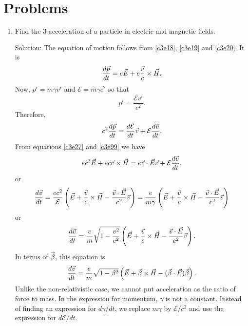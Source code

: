 \section{Problems}
\begin{enumerate}
\item Find the 3-acceleration of a particle in electric and magnetic fields.
\item[Solution:] The equation of motion follows from \eqref{c3e18}, \eqref{c3e19}
and \eqref{c3e20}. It is
\begin{equation}\label{c3e100}
\frac{d{\vec{p}}}{d{t}} = e\vec{E} + e\frac{\vec{v}}{c}\times\vec{H}.
\end{equation}
Now, $p^i = m\gamma v^i$ and $\mathcal{E} = m\gamma c^2$ so that 
\[
p^i = \frac{\mathcal{E} v^i}{c^2}.
\]
Therefore,
\[
c^2\frac{d{\vec{p}}}{d{t}} = \frac{d{\mathcal{E}}}{d{t}}\vec{v} + \mathcal{E}\frac{d{\vec{v}}}{d{t}}.
\]
From equations \eqref{c3e27} and \eqref{c3e99} we have
\[
ec^2\vec{E} + ec\vec{v}\times\vec{H} = e\vec{v}\cdot\vec{E}\vec{v} + \mathcal{E}\frac{d{\vec{v}}}{d{t}}.
\]
or
\[
\frac{d{\vec{v}}}{d{t}} = \frac{ec^2}{\mathcal{E}}
\left(\vec{E} + \frac{\vec{v}}{c}\times\vec{H} - \frac{\vec{v}\cdot\vec{E}}{c^2}\vec{v}\right)
= \frac{e}{m\gamma}
\left(\vec{E} + \frac{\vec{v}}{c}\times\vec{H} - \frac{\vec{v}\cdot\vec{E}}{c^2}\vec{v}\right)
\]
or
\begin{equation}\label{c3e101}
\frac{d{\vec{v}}}{d{t}} = \frac{e}{m}\sqrt{1 - \frac{v^2}{c^2}}
\left(\vec{E} + \frac{\vec{v}}{c}\times\vec{H} - \frac{\vec{v}\cdot\vec{E}}{c^2}\vec{v}\right).
\end{equation}
In terms of $\vec{\beta}$, this equation is
\begin{equation}\label{c3e102}
\frac{d{\vec{v}}}{d{t}} = \frac{e}{m}\sqrt{1 - \beta^2}
\left(\vec{E} + \vec{\beta}\times\vec{H} - (\vec{\beta}\cdot\vec{E})\vec{\beta}\right).
\end{equation}
Unlike the non-relativistic case, we cannot put acceleration as the ratio of 
force to mass. In the expression for momentum, $\gamma$ is not a constant. Instead of
finding an expression for $d\gamma/dt$, we replace $m\gamma$ by $\mathcal{E}/c^2$
and use the expression for $d\mathcal{E}/dt$.


\end{enumerate}
